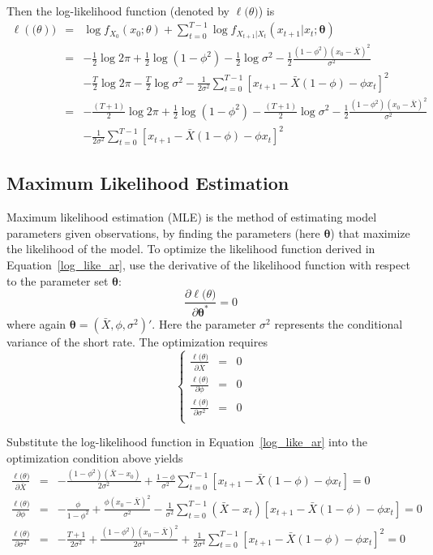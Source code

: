 \documentclass[11pt,reqno,final]{amsart}
\begin{document}
Then the log-likelihood function (denoted by $\ell\mathbf(\theta)$) is
\begin{eqnarray*} \label{log_like_ar}
\ell(\mathbf(\theta)) &=& \log f_{X_0}(x_0;\theta) + \sum_{t=0}^{T-1} \log f_{X_{t+1}|X_{t}}(x_{t+1}|x_t; \mathbf{\theta}) \\
                      &=& -\frac{1}{2}\log 2\pi + \frac{1}{2}\log(1-\phi^2)-\frac{1}{2}\log \sigma^2 - \frac{1}{2} \frac{(1-\phi^2)(x_0-\bar{X})^2}{\sigma^2} \\
                      & & -\frac{T}{2}\log 2\pi - \frac{T}{2} \log \sigma^2 - \frac{1}{2\sigma^2} \sum_{t=0}^{T-1} [x_{t+1} - \bar{X}(1-\phi)-\phi x_t]^2 \\
                      &=& -\frac{(T+1)}{2}\log 2\pi + \frac{1}{2}\log(1-\phi^2)-\frac{(T+1)}{2}\log \sigma^2 - \frac{1}{2} \frac{(1-\phi^2)(x_0-\bar{X})^2}{\sigma^2} \\
                      & & - \frac{1}{2\sigma^2} \sum_{t=0}^{T-1} [x_{t+1} - \bar{X}(1-\phi)-\phi x_t]^2
\end{eqnarray*}

\subsection{Maximum Likelihood Estimation}
Maximum likelihood estimation (MLE) is the method of estimating model parameters given observations, by finding the parameters (here $\mathbf{\theta}$) that maximize the likelihood of the model. To optimize the likelihood function derived in Equation~\ref{log_like_ar}, use the derivative of the likelihood function with respect to the parameter set $\mathbf{\theta}$:
$$
\frac{\partial \ell\mathbf(\theta)}{\partial \mathbf{\theta}^*} = 0
$$
where again $\mathbf{\theta} = (\bar{X}, \phi, \sigma^2)'$. Here the parameter $\sigma^2$ represents the conditional variance of the short rate. The optimization requires
$$
\left\{
  \begin{array}{rcr}
    \frac{\ell\mathbf(\theta)}{\partial \bar{X}} & = & 0 \\
    \frac{\ell\mathbf(\theta)}{\partial \phi} & = & 0 \\
    \frac{\ell\mathbf(\theta)}{\partial \sigma^2} & = & 0 \\
  \end{array}
\right.
$$

Substitute the log-likelihood function in Equation~\ref{log_like_ar} into the optimization condition above yields
\begin{eqnarray*}
    \frac{\ell\mathbf(\theta)}{\partial \bar{X}} & = & -\frac{(1-\phi^2)(\bar{X}-x_0)}{2\sigma^2} + \frac{1-\phi}{\sigma^2}\sum_{t=0}^{T-1}[x_{t+1}-\bar{X}(1-\phi)-\phi x_t] = 0 \\
    \frac{\ell\mathbf(\theta)}{\partial \phi} & = & -\frac{\phi}{1-\phi^2} + \frac{\phi(x_0-\bar{X})^2}{\sigma^2} - \frac{1}{\sigma^2}\sum_{t=0}^{T-1}(\bar{X} - x_t)[x_{t+1}-\bar{X}(1-\phi)-\phi x_t] = 0 \\
    \frac{\ell\mathbf(\theta)}{\partial \sigma^2} & = & -\frac{T+1}{2\sigma^2} + \frac{(1-\phi^2)(x_0-\bar{X})^2}{2\sigma^4} + \frac{1}{2\sigma^4}\sum_{t=0}^{T-1}[x_{t+1}-\bar{X}(1-\phi)-\phi x_t]^2 = 0 \\
\end{eqnarray*}
\end{document}
